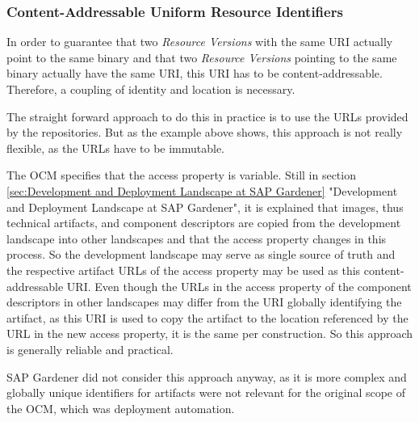 \subsubsection{Content-Addressable Uniform Resource Identifiers}
In order to guarantee that two \emph{Resource Versions} with the same URI actually point to the same binary and that two \emph{Resource Versions} pointing to the same binary actually have the same URI, this URI has to be content-addressable. Therefore, a coupling of identity and location is necessary.\par 
The straight forward approach to do this in practice is to use the URLs provided by the repositories. But as the example above shows, this approach is not really flexible, as the URLs have to be immutable.\par 
The OCM specifies that the access property is variable. Still in section \ref{sec:Development and Deployment Landscape at SAP Gardener} "Development and Deployment Landscape at SAP Gardener", it is explained that images, thus technical artifacts, and component descriptors are copied from the development landscape into other landscapes and that the access property changes in this process. So the development landscape may serve as single source of truth and the respective artifact URLs of the access property may be used as this content-addressable URI. Even though the URLs in the access property of the component descriptors in other landscapes may differ from the URI globally identifying the artifact, as this URI is used to copy the artifact to the location referenced by the URL in the new access property, it is the same per construction. So this approach is generally reliable and practical.\par
SAP Gardener did not consider this approach anyway, as it is more complex and globally unique identifiers for artifacts were not relevant for the original scope of the OCM, which was deployment automation. 

